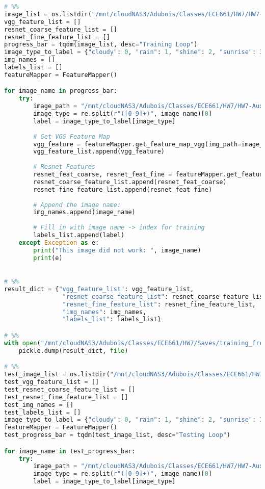 \documentclass{article}
\begin{document}
\begin{lstlisting}[language=Python]
# %%
image_list = os.listdir("/mnt/cloudNAS3/Adubois/Classes/ECE661/HW7/HW7-Auxilliary/data/training/")
vgg_feature_list = []
resnet_coarse_feature_list = []
resnet_fine_feature_list = []
progress_bar = tqdm(image_list, desc="Training Loop")
image_type_to_label = {"cloudy": 0, "rain": 1, "shine": 2, "sunrise": 3}
img_names = []
labels_list = []
featureMapper = FeatureMapper()

for image_name in progress_bar:
    try:
        image_path = "/mnt/cloudNAS3/Adubois/Classes/ECE661/HW7/HW7-Auxilliary/data/training/" + image_name
        image_type = re.split(r"([0-9]+)", image_name)[0]
        label = image_type_to_label[image_type]
        
        # Get VGG Feature Map
        vgg_feature = featureMapper.get_feature_map_vgg(img_path=image_path)
        vgg_feature_list.append(vgg_feature)
        
        # Resnet Features
        resnet_feat_coarse, resnet_feat_fine = featureMapper.get_feature_map_resnet(img_path=image_path)
        resnet_coarse_feature_list.append(resnet_feat_coarse)
        resnet_fine_feature_list.append(resnet_feat_fine)
        
        # Append the image name:
        img_names.append(image_name)
        
        # Fill in with image name -> index for training
        labels_list.append(label)
    except Exception as e:
        print("This image did not work: ", image_name)
        print(e)
    

# %%
result_dict = {"vgg_feature_list": vgg_feature_list,
                "resnet_coarse_feature_list": resnet_coarse_feature_list,
                "resnet_fine_feature_list": resnet_fine_feature_list,
                "img_names": img_names,
                "labels_list": labels_list}

# %%
with open("/mnt/cloudNAS3/Adubois/Classes/ECE661/HW7/Saves/training_freature_mats.pkl", "wb") as file:
    pickle.dump(result_dict, file)

# %%
test_image_list = os.listdir("/mnt/cloudNAS3/Adubois/Classes/ECE661/HW7/HW7-Auxilliary/data/testing/")
test_vgg_feature_list = []
test_resnet_coarse_feature_list = []
test_resnet_fine_feature_list = []
test_img_names = []
test_labels_list = []
image_type_to_label = {"cloudy": 0, "rain": 1, "shine": 2, "sunrise": 3}
featureMapper = FeatureMapper()
test_progress_bar = tqdm(test_image_list, desc="Testing Loop")

for image_name in test_progress_bar:
    try:
        image_path = "/mnt/cloudNAS3/Adubois/Classes/ECE661/HW7/HW7-Auxilliary/data/testing/" + image_name
        image_type = re.split(r"([0-9]+)", image_name)[0]
        label = image_type_to_label[image_type]
        

\end{lstlisting}
\end{document}
